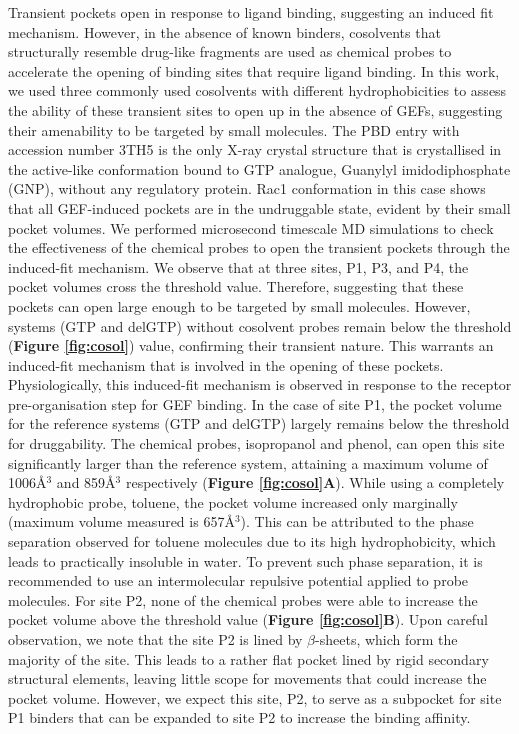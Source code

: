 \documentclass[12pt, a4paper]{achemso}
\begin{document}
Transient pockets open in response to ligand binding, suggesting an induced fit mechanism. However, in the absence of known binders, cosolvents that structurally resemble drug-like fragments are used as chemical probes to accelerate the opening of binding sites that require ligand binding. In this work, we used three commonly used cosolvents with different hydrophobicities to assess the ability of these transient sites to open up in the absence of GEFs, suggesting their amenability to be targeted by small molecules. The PBD entry with accession number 3TH5 is the only X-ray crystal structure that is crystallised in the active-like conformation bound to GTP analogue, Guanylyl imidodiphosphate (GNP), without any regulatory protein. Rac1 conformation in this case shows that all GEF-induced pockets are in the undruggable state, evident by their small pocket volumes. We performed microsecond timescale MD simulations to check the effectiveness of the chemical probes to open the transient pockets through the induced-fit mechanism. We observe that at three sites, P1, P3, and P4, the pocket volumes cross the threshold value.  Therefore, suggesting that these pockets can open large enough to be targeted by small molecules. However, systems (GTP and delGTP) without cosolvent probes remain below the threshold (\textbf{Figure \ref{fig:cosol}}) value, confirming their transient nature. This warrants an induced-fit mechanism that is involved in the opening of these pockets. Physiologically, this induced-fit mechanism is observed in response to the receptor pre-organisation step for GEF binding.
In the case of site P1, the pocket volume for the reference systems (GTP and delGTP) largely remains below the threshold for druggability. The chemical probes, isopropanol and phenol, can open this site significantly larger than the reference system, attaining a maximum volume of 1006\r{A}$^3$ and  859\r{A}$^3$ respectively (\textbf{Figure \ref{fig:cosol}A}). While using a completely hydrophobic probe, toluene, the pocket volume increased only marginally (maximum volume measured is 657\r{A}$^3$). This can be attributed to the phase separation observed for toluene molecules due to its high hydrophobicity, which leads to practically insoluble in water. To prevent such phase separation, it is recommended to use an intermolecular repulsive potential applied to probe molecules\cite{cosolvkit}. For site P2, none of the chemical probes were able to increase the pocket volume above the threshold value (\textbf{Figure \ref{fig:cosol}B}). Upon careful observation, we note that the site P2 is lined by $\beta$-sheets, which form the majority of the site. This leads to a rather flat pocket lined by rigid secondary structural elements, leaving little scope for movements that could increase the pocket volume. However, we expect this site, P2, to serve as a subpocket for site P1 binders that can be expanded to site P2 to increase the binding affinity. 
\end{document}
